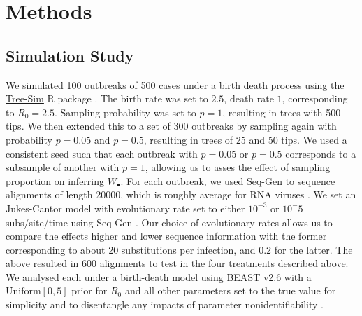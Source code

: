 \documentclass{article}
\begin{document}
\section*{Methods}
\subsection*{Simulation Study}
We simulated 100 outbreaks of 500 cases under a birth death process using the \url{Tree-Sim} R package \citep{TreeSim}. The birth rate was set to $2.5$, death rate $1$, corresponding to $R_{0} = 2.5$. Sampling probability was set to $p=1$, resulting in trees with 500 tips. We then extended this to a set of 300 outbreaks by sampling again with probability $p=0.05$ and $p = 0.5$, resulting in trees of 25 and 50 tips. We used a consistent seed such that each outbreak with $p=0.05$ or $p=0.5$ corresponds to a subsample of another with $p=1$, allowing us to asses the effect of sampling proportion on inferring $W_{\bullet}$. For each outbreak, we used Seq-Gen to sequence alignments of length 20000, which is roughly average for RNA viruses \citep{sanjuan2010viral,rambaut_seq-gen_1997}. We set an Jukes-Cantor model with evolutionary rate set to either $10^{-3}$ or $10^-{5}$ subs/site/time using Seq-Gen \cite{rambaut_seq-gen_1997}.  Our choice of evolutionary rates allows us to compare the effects higher and lower sequence information with the former corresponding to about 20 substitutions per infection, and 0.2 for the latter. 
The above resulted in 600 alignments to test in the four treatments described above. We analysed each under a birth-death model using BEAST v2.6 \citet{bouckaert_beast_2019} with a $\textrm{Uniform}[0,5]$ prior for $R_0$ and all other parameters set to the true value for simplicity and to disentangle any impacts of parameter nonidentifiability \citep{louca2021fundamental}.
\end{document}
